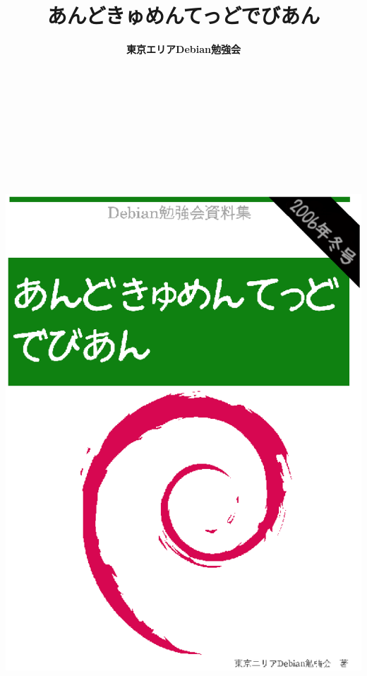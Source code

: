 \documentclass[mingoth,a4paper]{jsarticle}
\begin{document}
\begin{titlepage}

\title{
あんどきゅめんてっどでびあん}
\date{}
\author{\bf 東京エリアDebian勉強会} 

\includegraphics[height=252mm]{image2006-fuyu/titlepage-winter.eps}

\end{titlepage}
\end{document}
